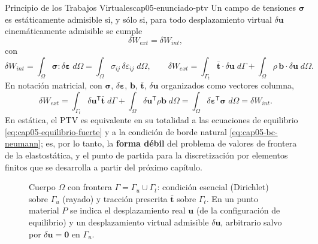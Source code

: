 \begin{ecnimportante}{Principio de los Trabajos Virtuales}{cap05-enunciado-ptv}
Un campo de tensiones $\bm\sigma$ es estáticamente admisible si, y sólo si, para todo desplazamiento virtual $\delta\bm u$ cinemáticamente admisible se cumple
\[
\delta W_{ext} = \delta W_{int} ,
\]
con
\[
\delta W_{int} = \int_\Omega \bm\sigma:\delta\bm\varepsilon\;d\Omega = \int_\Omega \sigma_{ij}\,\delta\varepsilon_{ij}\;d\Omega, \qquad
\delta W_{ext} = \int_{\Gamma_t} \bar{\bm t}\cdot\delta\bm u\;d\Gamma + \int_\Omega \rho\,\bm b\cdot\delta\bm u\;d\Omega .
\]
En notación matricial, con $\bm\sigma$, $\delta\bm\varepsilon$, $\bm b$, $\bar{\bm t}$, $\delta\bm u$ organizados como vectores columna,
\[
\delta W_{ext} = \int_{\Gamma_t} \delta\bm{u}^{\mathsf T}\bar{\bm t}\;d\Gamma + \int_\Omega \delta\bm{u}^{\mathsf T}\rho\bm b\;d\Omega = \int_\Omega \delta\bm{\varepsilon}^{\mathsf T}\bm\sigma\;d\Omega = \delta W_{int} .
\]
En estática, el PTV es equivalente en su totalidad a las ecuaciones de equilibrio \eqref{eq:cap05-equilibrio-fuerte} y a la condición de borde natural \eqref{eq:cap05-bc-neumann}; es, por lo tanto, la \textbf{forma débil} del problema de valores de frontera de la elastostática, y el punto de partida para la discretización por elementos finitos que se desarrolla a partir del próximo capítulo.
\end{ecnimportante}

\begin{figure}[htbp]
\centering
{}
\caption{Cuerpo $\Omega$ con frontera $\Gamma=\Gamma_u\cup\Gamma_t$: condición esencial (Dirichlet) sobre $\Gamma_u$ (rayado) y tracción prescrita $\bar{\bm t}$ sobre $\Gamma_t$. En un punto material $P$ se indica el desplazamiento real $\bm u$ (de la configuración de equilibrio) y un desplazamiento virtual admisible $\delta\bm u$, arbitrario salvo por $\delta\bm u=\bm 0$ en $\Gamma_u$.}
\label{fig:cap05-cuerpo-virtual}
\end{figure}

